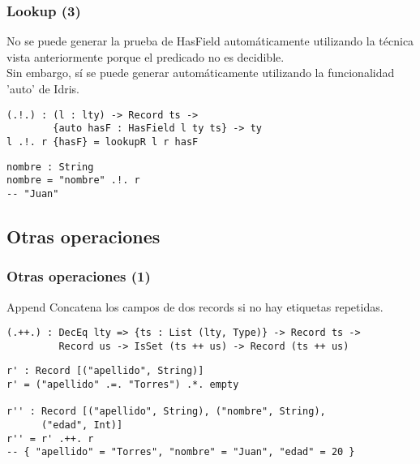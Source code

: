 \documentclass{beamer}
\begin{document}
\begin{frame}[fragile]
\frametitle{Lookup (3)}

No se puede generar la prueba de HasField automáticamente utilizando la técnica vista anteriormente porque el predicado no es decidible. \\

Sin embargo, sí se puede generar automáticamente utilizando la funcionalidad 'auto' de Idris.

\pause

\begin{definition}
\begin{verbatim}
(.!.) : (l : lty) -> Record ts -> 
        {auto hasF : HasField l ty ts} -> ty
l .!. r {hasF} = lookupR l r hasF
\end{verbatim}
\end{definition}

\pause

\begin{example}
\begin{verbatim}
nombre : String
nombre = "nombre" .!. r
-- "Juan"
\end{verbatim}
\end{example}

\end{frame}

\subsection{Otras operaciones}

\begin{frame}[fragile]
\frametitle{Otras operaciones (1)}

\begin{block}{Append}
Concatena los campos de dos records si no hay etiquetas repetidas.

\begin{definition}
\begin{verbatim}
(.++.) : DecEq lty => {ts : List (lty, Type)} -> Record ts -> 
         Record us -> IsSet (ts ++ us) -> Record (ts ++ us)
\end{verbatim}
\end{definition}

\begin{example}
\begin{verbatim}
r' : Record [("apellido", String)]
r' = ("apellido" .=. "Torres") .*. empty

r'' : Record [("apellido", String), ("nombre", String), 
      ("edad", Int)]
r'' = r' .++. r
-- { "apellido" = "Torres", "nombre" = "Juan", "edad" = 20 }
\end{verbatim}
\end{example}

\end{block}

\end{frame}
\end{document}
